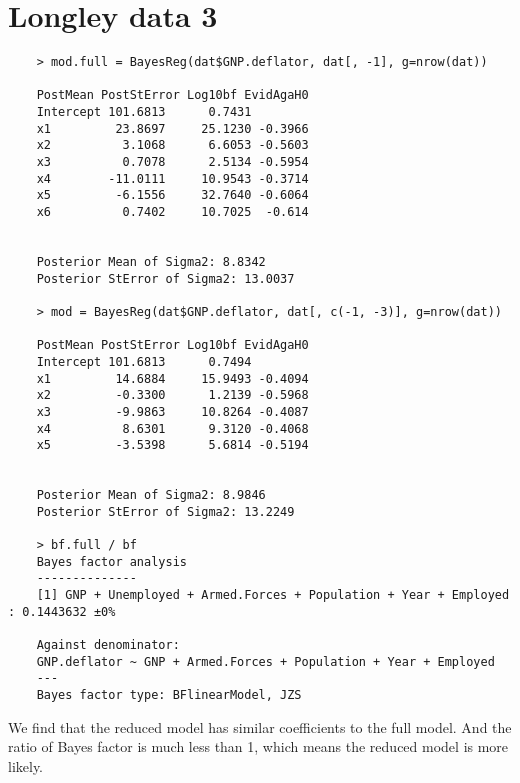 \documentclass{article}
\begin{document}
\section*{Longley data 3}
{
    \begin{lstlisting}
    > mod.full = BayesReg(dat$GNP.deflator, dat[, -1], g=nrow(dat))

    PostMean PostStError Log10bf EvidAgaH0
    Intercept 101.6813      0.7431                  
    x1         23.8697     25.1230 -0.3966          
    x2          3.1068      6.6053 -0.5603          
    x3          0.7078      2.5134 -0.5954          
    x4        -11.0111     10.9543 -0.3714          
    x5         -6.1556     32.7640 -0.6064          
    x6          0.7402     10.7025  -0.614          


    Posterior Mean of Sigma2: 8.8342
    Posterior StError of Sigma2: 13.0037

    > mod = BayesReg(dat$GNP.deflator, dat[, c(-1, -3)], g=nrow(dat))

    PostMean PostStError Log10bf EvidAgaH0
    Intercept 101.6813      0.7494                  
    x1         14.6884     15.9493 -0.4094          
    x2         -0.3300      1.2139 -0.5968          
    x3         -9.9863     10.8264 -0.4087          
    x4          8.6301      9.3120 -0.4068          
    x5         -3.5398      5.6814 -0.5194          


    Posterior Mean of Sigma2: 8.9846
    Posterior StError of Sigma2: 13.2249

    > bf.full / bf
    Bayes factor analysis
    --------------
    [1] GNP + Unemployed + Armed.Forces + Population + Year + Employed : 0.1443632 ±0%

    Against denominator:
    GNP.deflator ~ GNP + Armed.Forces + Population + Year + Employed 
    ---
    Bayes factor type: BFlinearModel, JZS
    \end{lstlisting}

    We find that the reduced model has similar coefficients to the full model. And the ratio of Bayes factor is much less than 1, which means the reduced model is more likely. 
}

\clearpage
\end{document}
